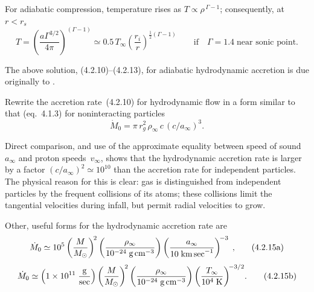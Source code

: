 For adiabatic compression, temperature rises as
$T \propto \rho^{\,\Gamma-1}$; consequently, at $r < r_s$
\begin{equation}
T = \left(\frac{a\Gamma^{3/2}}{4\pi}\right)^{(\Gamma-1)}
\simeq 0.5\,T_\infty\left(\frac{r_i}{r}\right)^{\frac{1}{2}(\Gamma-1)}
\qquad \text{if} \quad \Gamma = 1.4\;\text{near sonic point.}
\tag{4.2.13c}
\end{equation}

The above solution, (4.2.10)--(4.2.13), for adiabatic hydrodynamic accretion
is due originally to \citet{Bondi1952}.

Rewrite the accretion rate~(4.2.10) for hydrodynamic flow in a form similar
to that (eq.~4.1.3) for noninteracting particles
\begin{equation}
\dot{M}_0 = \pi\,r_g^2\,\rho_\infty\,c\,(c/a_\infty)^3.
\tag{4.2.14}
\end{equation}

Direct comparison, and use of the approximate equality between speed of sound
$a_\infty$ and proton speeds~$v_\infty$, shows that the hydrodynamic
accretion rate is larger by a factor $(c/a_\infty)^2 \simeq 10^{10}$ than
the accretion rate for independent particles.  The physical reason for this
is clear: gas is distinguished from independent particles by the frequent
collisions of its atoms; these collisions limit the tangential velocities
during infall, but permit radial velocities to grow.

Other, useful forms for the hydrodynamic accretion rate are
\begin{equation}
\dot{M}_0 \simeq 10^{5}
\left(\frac{M}{M_\odot}\right)^{\!2}
\left(\frac{\rho_\infty}{10^{-24}\;\text{g\,cm}^{-3}}\right)
\left(\frac{a_\infty}{10\;\text{km\,sec}^{-1}}\right)^{\!-3}
\;\text{,}
\tag{4.2.15a}
\end{equation}
%
\begin{equation}
\dot{M}_0 \simeq \left(1\times 10^{11}\;\frac{\text{g}}{\text{sec}}\right)
\left(\frac{M}{M_\odot}\right)^{\!2}
\left(\frac{\rho_\infty}{10^{-24}\;\text{g\,cm}^{-3}}\right)
\left(\frac{T_\infty}{10^4\;\text{K}}\right)^{\!-3/2}\!.
\tag{4.2.15b}
\end{equation}
